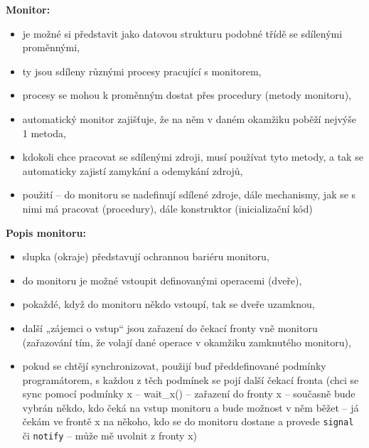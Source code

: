 \documentclass[a4paper, 11pt]{article}
\newcommand{\tcmd}[1]{\texttt{#1}}
\begin{document}
\textbf{Monitor:}
\begin{itemize}
    \item je možné si představit jako datovou strukturu podobné třídě se sdílenými proměnnými,
    \item ty jsou sdíleny různými procesy pracující s monitorem,
    \item procesy se mohou k proměnným dostat přes procedury (metody monitoru),
    \item automatický monitor zajišťuje, že na něm v daném okamžiku poběží nejvýše 1 metoda,
    \item kdokoli chce pracovat se sdílenými zdroji, musí používat tyto metody, a tak se automaticky zajistí zamykání a odemykání zdrojů,
    \item použití -- do monitoru se nadefinují sdílené zdroje, dále mechanismy, jak se s nimi má pracovat (procedury), dále konstruktor (inicializační kód)
\end{itemize}

\newpage
\textbf{Popis monitoru:}
\begin{itemize}
    \item slupka (okraje) představují ochrannou bariéru monitoru,
    \item do monitoru je možné vstoupit definovanými operacemi (dveře),
    \item pokaždé, když do monitoru někdo vstoupí, tak se dveře uzamknou,
    \item další „zájemci o vstup“ jsou zařazení do čekací fronty vně monitoru (zařazování tím, že volají dané operace v okamžiku zamknutého monitoru),
    \item pokud se chtějí synchronizovat, použijí buď předdefinované podmínky programátorem, s každou z těch podmínek se pojí další čekací fronta (chci se sync pomocí podmínky x -- wait\_x() -- zařazení do fronty x -- současně bude vybrán někdo, kdo čeká na vstup monitoru a bude možnost v něm běžet -- já čekám ve frontě x na někoho, kdo se do monitoru dostane a provede \tcmd{signal} či \tcmd{notify} -- může mě uvolnit z fronty x)
\end{itemize}
\end{document}
